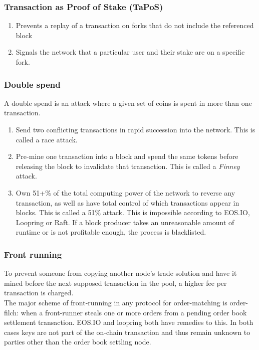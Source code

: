 \documentclass[]{article}
\begin{document}
{		\subsubsection{Transaction as Proof of Stake (TaPoS)}
			\begin{enumerate}
				\item Prevents a replay of a transaction on forks that do not include the referenced block 
				\item Signals the network that a particular user and their stake are on a specific fork.
			\end{enumerate}
		\subsubsection{Double spend}
		A double spend is an attack where a given set of coins is spent in more than one transaction.
		\begin{enumerate}
			\item Send two conflicting transactions in rapid succession into the network. This is called a race attack. 
			\item Pre-mine one transaction into a block and spend the same tokens before releasing the block to invalidate that transaction. 
			This is called a \textit{Finney} attack.
			\item Own 51+\% of the total computing power of the network to reverse any transaction, 
			as well as have total control of which transactions appear in blocks. 
			This is called a 51\% attack.
			This is impossible according to EOS.IO, Loopring or Raft.
			If a block producer takes an unreasonable amount of runtime or is not profitable enough, the process is blacklisted.\cite{7}
		\end{enumerate} 

		\subsubsection{Front running}
		To prevent someone from copying another node's trade solution 
		and have it mined before the next supposed transaction in the pool, 
		a higher fee per transaction is charged.\\ 
		The major scheme of front-running in any protocol for
		order-matching is order-filch: when a front-runner steals
		one or more orders from a pending order book settlement
		transaction. EOS.IO and loopring both have remedies to this.
		In both cases keys are not part of the on-chain transaction and thus remain unknown to parties other than the order book settling node.
		
}
\end{document}
